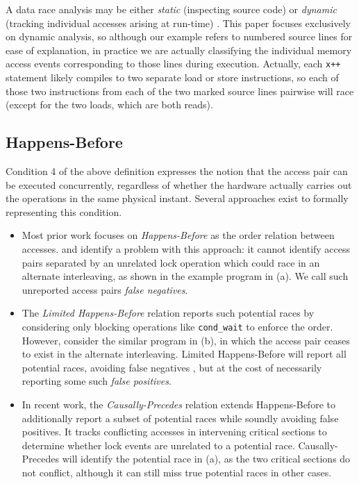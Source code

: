 A data race analysis may be either {\em static} (inspecting source code) \cite{racerx}
or {\em dynamic} (tracking individual accesses arising at run-time) \cite{tsan}.
This paper focuses exclusively on dynamic analysis,
so although our example refers to numbered source lines for ease of explanation,
in practice we are actually classifying the individual memory access events corresponding to those lines during execution.
Actually, each {\tt x++} statement likely compiles to two separate load or store instructions, so each of those two instructions from each of the two marked source lines pairwise will race (except for the two loads, which are both reads).

\subsection{Happens-Before}
\label{sec:background-hb}

Condition 4 of the above definition expresses the notion that the access pair can be executed concurrently,
regardless of whether the hardware actually carries out the operations in the same physical instant.
Several approaches exist to formally representing this condition.

\begin{itemize}
	\item Most prior work focuses on {\em Happens-Before} \cite{lamport-clocks} as the order relation between accesses.
\cite{predictive-dr} and \cite{hybriddatarace} identify a problem with this approach:
it cannot identify access pairs separated by an unrelated lock operation which could race in an alternate interleaving,
as shown in the example program in (a).
We call such unreported access pairs {\em false negatives}.

\item
The {\em Limited Happens-Before} relation \cite{hybriddatarace}
reports such potential races
by considering only blocking operations like {\tt cond\_wait} to enforce the order.
However, consider the similar program in (b),
in which the access pair ceases to exist in the alternate interleaving.
Limited Happens-Before will report all potential races, avoiding false negatives \cite{tsan},
but at the cost of necessarily reporting some such {\em false positives}.

\item
In recent work, the {\em Causally-Precedes} relation \cite{predictive-dr} %
extends Happens-Before to additionally report a subset of potential races while soundly avoiding false positives.
It tracks conflicting accesses in intervening
critical sections to determine whether lock events are unrelated to a potential race.
Causally-Precedes will identify the potential race in (a), as the two critical sections do not conflict,
although it can still miss true potential races in other cases.
\end{itemize}

